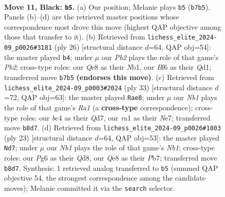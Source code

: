 \documentclass[11pt]{article}
\begin{document}
\clearpage

\begin{figure}[p]\centering
\begin{subfigure}{0.46\textwidth}\centering
\resizebox{\linewidth}{!}{%
\newchessgame
\chessboard[
  setfen={rn2qrk1/ppp1pp1p/5bp1/3P4/2B1P3/B1P4P/P4P1P/R2QK2R b KQ - 0 11},
  showmover=false,
  pgfstyle=straightmove, color=movearrow, markmove={b7-b5}
]}
\caption{}
\end{subfigure}\hfill
\begin{subfigure}{0.46\textwidth}\centering
\resizebox{\linewidth}{!}{%
\newchessgame
\chessboard[
  setfen={r1bq3r/p1p1kp2/2p5/2bpP1p1/6B1/6P1/PPP2PP1/RN1Q1RK1 w - - 1 14},
  showmover=false,
  pgfstyle=straightmove, color=movearrow, markmove={b2-b4}
]}
\caption{}
\end{subfigure}
\\[4pt]
\begin{subfigure}{0.46\textwidth}\centering
\resizebox{\linewidth}{!}{%
\newchessgame
\chessboard[
  setfen={r4rk1/1ppqn1pp/pb1p1p2/3P4/7P/5Q2/PPBB1PP1/R4RK1 b - - 1 17},
  showmover=false,
  pgfstyle=straightmove, color=movearrow, markmove={a8-e8}
]}
\caption{}
\end{subfigure}\hfill
\begin{subfigure}{0.46\textwidth}\centering
\resizebox{\linewidth}{!}{%
\newchessgame
\chessboard[
  setfen={rn1q1rk1/1pp2ppp/3p4/p1bP4/P7/6N1/1PP2PPP/R1BQ1RK1 b - - 1 12},
  showmover=false,
  pgfstyle=straightmove, color=movearrow, markmove={b8-d7}
]}
\caption{}
\end{subfigure}
\caption{\textbf{Move 11, Black: \texttt{b5}.} (a) Our position; Melanie plays \texttt{b5} (\texttt{b7b5}). Panels (b)--(d) are the retrieved master positions whose correspondence most drove this move (highest QAP objective among those that transfer to it). (b) Retrieved from \texttt{lichess\_elite\_2024-09\_p0026\#3181} (ply 26) [structural distance $d$=64, QAP obj=54]: the master played \texttt{b4}; under $\mu$ our \emph{Pb2} plays the role of that game's \emph{Pb2}; cross-type roles: our \emph{Q}e8 as their \emph{N}b1, our \emph{B}f6 as their \emph{Q}d1; transferred move \texttt{b7b5} \textbf{(endorses this move)}. (c) Retrieved from \texttt{lichess\_elite\_2024-09\_p0003\#2024} (ply 33) [structural distance $d$=72, QAP obj=63]: the master played \texttt{Rae8}; under $\mu$ our \emph{Nb1} plays the role of that game's \emph{Ra1} (a \textbf{cross-type} correspondence); cross-type roles: our \emph{b}c4 as their \emph{Q}d7, our \emph{r}a1 as their \emph{N}e7; transferred move \texttt{b8d7}. (d) Retrieved from \texttt{lichess\_elite\_2024-09\_p0026\#1803} (ply 23) [structural distance $d$=64, QAP obj=53]: the master played \texttt{Nd7}; under $\mu$ our \emph{Nb1} plays the role of that game's \emph{Nb1}; cross-type roles: our \emph{P}g6 as their \emph{Q}d8, our \emph{Q}e8 as their \emph{P}b7; transferred move \texttt{b8d7}. Synthesis: 1 retrieved analog transferred to \texttt{b5} (summed QAP objective 54, the strongest correspondence among the candidate moves); Melanie committed it via the \texttt{search} selector.}
\label{fig:thought-m21}
\end{figure}
\end{document}
